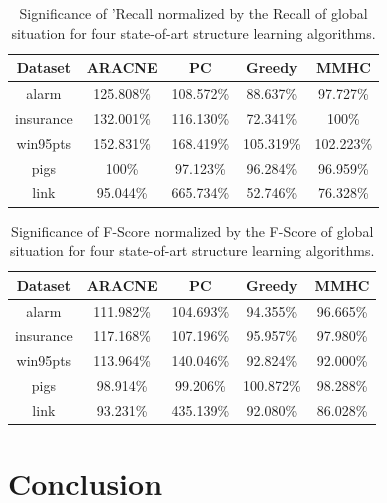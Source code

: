 \begin{table}[th]
\begin{center}
\caption{\label{tab:recallComp}Significance of \lama{}'Recall normalized by the Recall of global situation for four state-of-art structure learning algorithms.}
\small
\begin{tabular}{|c|cccc|}
\hline
Dataset   & ARACNE & PC & Greedy & MMHC \\
\hline
alarm     & 125.808\%& 108.572\%& 88.637\% & 97.727\% \\
insurance & 132.001\%& 116.130\%& 72.341\% & 100\%    \\
win95pts  & 152.831\%& 168.419\%& 105.319\%& 102.223\%\\
pigs      & 100\%    & 97.123\% & 96.284\% & 96.959\% \\
link      & 95.044\% & 665.734\%& 52.746\% & 76.328\% \\
\hline
\end{tabular}
\end{center}
\end{table}

\begin{table}[th]
\begin{center}
\caption{\label{tab:fscoreComp}Significance of \lama{}
F-Score normalized by the F-Score of global situation for
four state-of-art structure learning algorithms.}
\small
\begin{tabular}{|c|cccc|}
\hline
Dataset   & ARACNE & PC & Greedy & MMHC \\
\hline
alarm     & 111.982\%& 104.693\%& 94.355\% & 96.665\% \\
insurance & 117.168\%& 107.196\%& 95.957\% & 97.980\% \\
win95pts  & 113.964\%& 140.046\%& 92.824\% & 92.000\% \\
pigs      & 98.914\% & 99.206\% & 100.872\%& 98.288\% \\
link      & 93.231\% & 435.139\%& 92.080\% & 86.028\% \\
\hline
\end{tabular}
\end{center}
\end{table}


\section{Conclusion}

